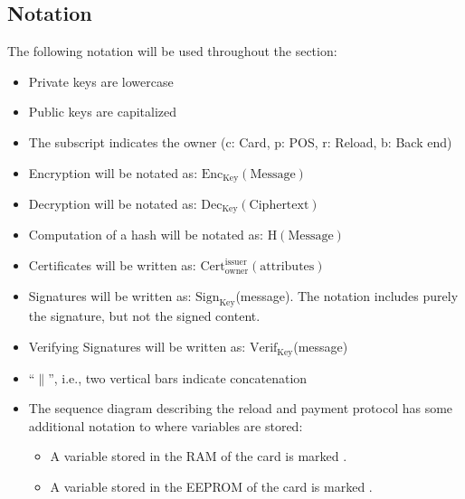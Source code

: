 \documentclass{article}
\begin{document}
\subsection{Notation} \label{sec:notation}
The following notation will be used throughout the section:
\begin{itemize}
    \item Private keys are lowercase
    
    \item Public keys are capitalized
    
    \item The subscript indicates the owner (c: Card, p: POS, r: Reload, b: Back end)
    
    \item Encryption will be notated as: $\textrm{Enc}_{\textrm{Key}}(\textrm{Message})$

    \item Decryption will be notated as: $\textrm{Dec}_{\textrm{Key}}(\textrm{Ciphertext})$
    
    \item Computation of a hash will be notated as: $\textrm{H}(\textrm{Message})$
    
    \item Certificates will be written as: $\textrm{Cert}_\textrm{owner}^\textrm{issuer}(\textrm{attributes})$

    \item Signatures will be written as: $\textrm{Sign}_{\textrm{Key}}$(message).
    The notation includes purely the signature, but not the signed content.

    \item Verifying Signatures will be written as: $\textrm{Verif}_{\textrm{Key}}$(message)

    \item ``$\|$'', i.e., two vertical bars indicate concatenation

    \item The sequence diagram describing the reload and payment protocol has some additional notation to where variables are stored:
    \begin{itemize}
        \item A variable stored in the RAM of the card is marked .
        \item A variable stored in the EEPROM of the card is marked .
    \end{itemize}
\end{itemize}
\end{document}

